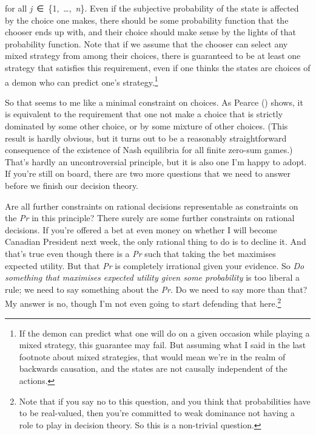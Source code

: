 \documentclass[
  10pt,
  letterpaper,
  DIV=11,
  numbers=noendperiod,
  twoside]{scrartcl}
\begin{document}
for all \emph{j}~∈~\{1,~\ldots,~\emph{n}\}. Even if the subjective
probability of the state is affected by the choice one makes, there
should be some probability function that the chooser ends up with, and
their choice should make sense by the lights of that probability
function. Note that if we assume that the chooser can select any mixed
strategy from among their choices, there is guaranteed to be at least
one strategy that satisfies this requirement, even if one thinks the
states are choices of a demon who can predict one's strategy.\footnote{If
  the demon can predict what one will do on a given occasion while
  playing a mixed strategy, this guarantee may fail. But assuming what I
  said in the last footnote about mixed strategies, that would mean
  we're in the realm of backwards causation, and the states are not
  causally independent of the actions.}

So that seems to me like a minimal constraint on choices. As Pearce
() shows, it is equivalent to the
requirement that one not make a choice that is strictly dominated by
some other choice, or by some mixture of other choices. (This result is
hardly obvious, but it turns out to be a reasonably straightforward
consequence of the existence of Nash equilibria for all finite zero-sum
games.) That's hardly an uncontroversial principle, but it is also one
I'm happy to adopt. If you're still on board, there are two more
questions that we need to answer before we finish our decision theory.

Are all further constraints on rational decisions representable as
constraints on the \emph{Pr} in this principle? There surely are some
further constraints on rational decisions. If you're offered a bet at
even money on whether I will become Canadian President next week, the
only rational thing to do is to decline it. And that's true even though
there is a \emph{Pr} such that taking the bet maximises expected
utility. But that \emph{Pr} is completely irrational given your
evidence. So \emph{Do something that maximises expected utility given
some probability} is too liberal a rule; we need to say something about
the \emph{Pr}. Do we need to say more than that? My answer is no, though
I'm not even going to start defending that here.\footnote{Note that if
  you say no to this question, and you think that probabilities have to
  be real-valued, then you're committed to weak dominance not having a
  role to play in decision theory. So this is a non-trivial question.}
\end{document}
